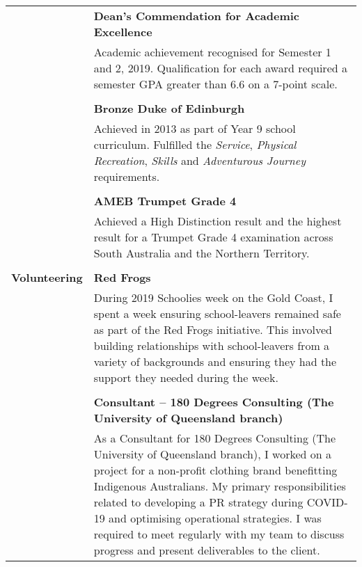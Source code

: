 \documentclass[a4paper]{article}
\begin{document}
\begin{longtable}{r p{13.5cm}}
										\vline & \textbf{Dean's Commendation for Academic Excellence} \\
										\vline & Academic achievement recognised for Semester 1 and 2, 2019. Qualification for each award required a semester GPA greater than 6.6 on a 7-point scale. \\
										\vline & \\
										
										\vline & \textbf{Bronze Duke of Edinburgh} \\
										\vline & Achieved in 2013 as part of Year 9 school curriculum. Fulfilled the \textit{Service}, \textit{Physical Recreation}, \textit{Skills} and \textit{Adventurous Journey} requirements. \\
										\vline & \\
										
										\vline & \textbf{AMEB Trumpet Grade 4} \\
										\vline & Achieved a High Distinction result and the highest result for a Trumpet Grade 4 examination across South Australia and the Northern Territory. \\
										& \\
										
	\textbf{Volunteering} 	\vline & \textbf{Red Frogs} \\
										\vline & During 2019 Schoolies week on the Gold Coast, I spent a week ensuring school-leavers remained safe as part of the Red Frogs initiative. This involved building relationships with school-leavers from a variety of backgrounds and ensuring they had the support they needed during the week. \\
										\vline & \\
										
										\vline & \textbf{Consultant – 180 Degrees Consulting (The University of Queensland branch)} \\
										\vline & As a Consultant for 180 Degrees Consulting (The University of Queensland branch), I worked on a project for a non-profit clothing brand benefitting Indigenous Australians. My primary responsibilities related to developing a PR strategy during COVID-19 and optimising operational strategies. I was required to meet regularly with my team to discuss progress and present deliverables to the client. \\
\end{longtable}
\end{document}
